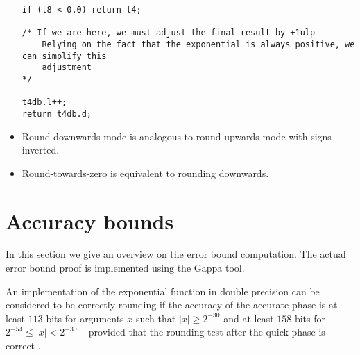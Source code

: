 \begin{itemize}
\begin{lstlisting}[caption={Rounding adjustment in round-upwards},firstnumber=1]
if (t8 < 0.0) return t4;

/* If we are here, we must adjust the final result by +1ulp 
	Relying on the fact that the exponential is always positive, we can simplify this
	adjustment 
*/

t4db.l++;
return t4db.d;
\end{lstlisting}
\item Round-downwards mode is analogous to round-upwards mode with signs inverted.
\item Round-towards-zero is equivalent to rounding downwards.
\end{itemize}
\section{Accuracy bounds}\label{sec:expaccuracy}
In this section we give an overview on the error bound
computation. The actual error bound proof is implemented using the
Gappa tool.

An implementation of the exponential function in double precision can
be considered to be correctly rounding if the accuracy of the accurate
phase is at least $113$ bits for arguments $x$ such that $\left \vert
x \right \vert \geq 2^{-30}$ and at least $158$ bits for $2^{-54} \leq
\left \vert x \right \vert < 2^{-30}$ -- provided that the rounding
test after the quick phase is correct \cite{DinDefLau2004LIP}.

